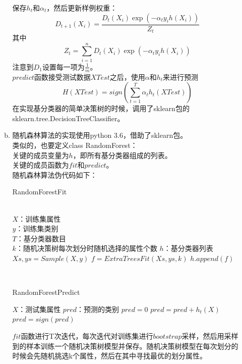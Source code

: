 \documentclass[a4paper,UTF8]{article}
\numberwithin{equation}{section}
\begin{document}
\begin{enumerate}[1.]
\begin{enumerate}[a.]
保存$h_t$和$\alpha_t$，然后更新样例权重：
\begin{equation}
D_{t+1}(X_i) = \frac{D_t(X_i)\exp(-\alpha_ty_ih(X_i))}{Z_t}
\end{equation}
其中
\begin{equation}
Z_t = \sum_{i=1}^{n}D_t(X_i)\exp(-\alpha_ty_ih(X_i))
\end{equation}
注意到$D_1$设置每一项为$\frac{1}{m}$。\\
$predict$函数接受测试数据$XTest$之后，使用$\alpha$和$h_t$来进行预测
\begin{equation}
H(XTest) = sign(\sum_{t=1}^{T}\alpha_th_t(XTest))
\end{equation}
在实现基分类器的简单决策树的时候，调用了sklearn包的sklearn.tree.DecisionTreeClassifier。
\item 随机森林算法的实现使用python 3.6，借助了sklearn包。\\
类似的，也要定义class RandomForest：\\
关键的成员变量为$h$，即所有基分类器组成的列表。\\
关键的成员函数为$fit$和$predict$。\\
随机森林算法伪代码如下：\\
\begin{algorithm}[!h]  
	\caption{RandomForestFit}  
	\begin{algorithmic}[1]  
		\Require\\  
		$X$：训练集属性\\
		$y$：训练集类别\\
		$T$：基分类器数目\\
		$k$：随机决策树每次划分时随机选择的属性个数
		\Ensure  
		$h$：基分类器列表 
		\State $Xs, ys = Sample(X, y)$
		\State $f = ExtraTreesFit(Xs, ys, k)$
		\State $h.append(f)$
		\EndFor
		\label{code:End1}  
	\end{algorithmic}  
\end{algorithm}\\
\begin{algorithm}[!h]  
	\caption{RandomForestPredict}  
	\begin{algorithmic}[1]  
		\Require
		$X$：测试集属性
		\Ensure  
		$pred$：预测的类别
		\State $pred = 0$ 
		\State $pred = pred + h_t(X)$
		\EndFor
		\State $pred = sign(pred)$
		\label{code:End2}  
	\end{algorithmic}  
\end{algorithm}
$fit$函数进行T次迭代，每次迭代对训练集进行$bootstrap$采样，然后用采样到的样本训练一个随机决策树模型并保存。随机决策树模型在每次划分的时候会先随机挑选k个属性，然后在其中寻找最优的划分属性。\\

\end{enumerate}
\end{enumerate}
\end{document}
